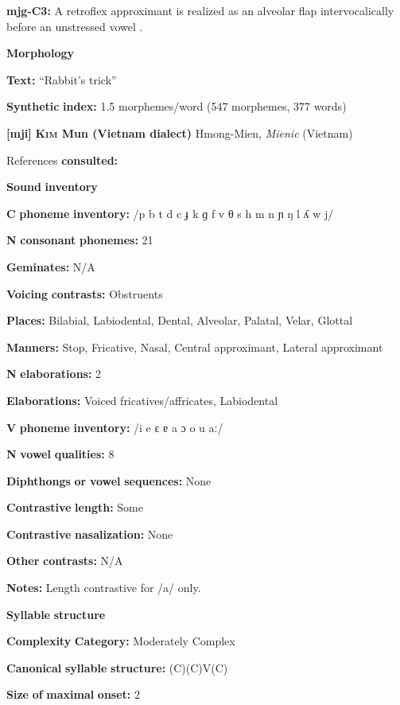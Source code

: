 \textbf{mjg-C3:} A retroflex approximant is realized as an alveolar flap intervocalically before an unstressed vowel \citep[31]{Slater2003}.

\textbf{Morphology}

\textbf{Text:} “Rabbit’s trick” \citep[343-350]{Slater2003}

\textbf{Synthetic} \textbf{index:} 1.5 morphemes/word (547 morphemes, 377 words)

\textbf{[mji]}   \textbf{\textsc{Kim} \textbf{Mun} \textbf{(Vietnam} \textbf{dialect)}}  Hmong-Mien, \textit{Mienic} (Vietnam)

References \textbf{consulted:} \citet{Clark2008}

\textbf{Sound} \textbf{inventory}

\textbf{C} \textbf{phoneme} \textbf{inventory:} /p b t d c ɟ k ɡ f v θ s h m n ɲ ŋ l ʎ w j/

\textbf{N} \textbf{consonant} \textbf{phonemes:} 21

\textbf{Geminates:} N/A

\textbf{Voicing} \textbf{contrasts:} Obstruents

\textbf{Places:} Bilabial, Labiodental, Dental, Alveolar, Palatal, Velar, Glottal

\textbf{Manners:} Stop, Fricative, Nasal, Central approximant, Lateral approximant

\textbf{N} \textbf{elaborations:} 2

\textbf{Elaborations:} Voiced fricatives/affricates, Labiodental

\textbf{V} \textbf{phoneme} \textbf{inventory:} /i e ɛ ɐ a ɔ o u aː/

\textbf{N} \textbf{vowel} \textbf{qualities:} 8

\textbf{Diphthongs} \textbf{or} \textbf{vowel} \textbf{sequences:} None

\textbf{Contrastive} \textbf{length:} Some

\textbf{Contrastive} \textbf{nasalization:} None

\textbf{Other} \textbf{contrasts:} N/A

\textbf{Notes:} Length contrastive for /a/ only.

\textbf{Syllable} \textbf{structure}

\textbf{Complexity} \textbf{Category:} Moderately Complex

\textbf{Canonical} \textbf{syllable} \textbf{structure:} (C)(C)V(C) \citep[123-7]{Clark2008}

\textbf{Size} \textbf{of} \textbf{maximal} \textbf{onset:} 2

